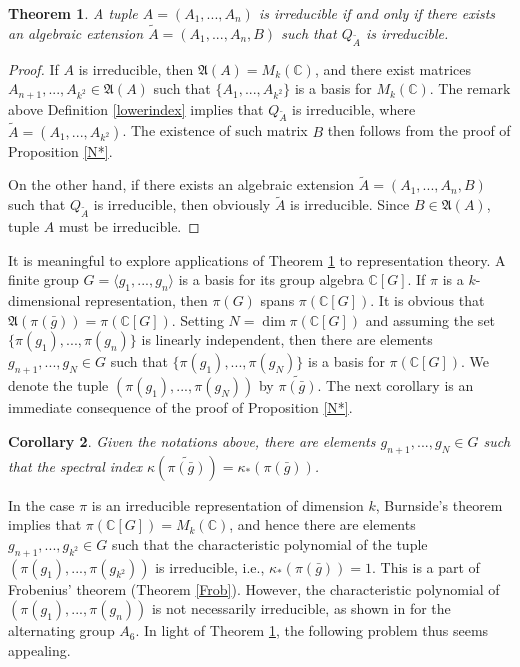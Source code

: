 \documentclass[draft, 12pt, reqno]{amsart}
\newcommand{\C}{{\mathbb C}}
\numberwithin{equation}{section}
\theoremstyle{plain}
\newtheorem{theorem}{Theorem}[section]
\newtheorem{corollary}[theorem]{Corollary}
\begin{document}
\begin{theorem}\label{mainthm}
 A tuple $A=(A_1, ..., A_n)$ is irreducible if and only if there exists an algebraic extension $\widetilde{A}=(A_1, ..., A_n, B)$ such that $Q_{\widetilde{A}}$ is irreducible. 
\end{theorem}
\begin{proof}
If $A$ is irreducible, then ${\mathfrak A}(A)=M_k(\C)$, and there exist matrices $A_{n+1}, ..., A_{k^2}\in {\mathfrak A}(A)$ such that $\{A_1, ..., A_{k^2}\}$ is a basis for $M_k(\C)$. The remark above Definition \ref{lowerindex} implies that $Q_{\widetilde{A}}$ is irreducible, where 
$\widetilde{A}=(A_1, ..., A_{k^2})$. The existence of such matrix $B$ then follows from the proof of Proposition \ref{N*}.

On the other hand, if there exists an algebraic extension $\widetilde{A}=(A_1, ..., A_n, B)$ such that $Q_{\widetilde{A}}$ is irreducible, then obviously $\widetilde{A}$ is irreducible. Since $B\in \mathfrak{A}(A)$, tuple $A$ must be irreducible.
\end{proof}

It is meaningful to explore applications of Theorem \ref{mainthm} to representation theory. A finite group $G=\langle g_1, ..., g_n\rangle$ is a basis for its group algebra $\C[G]$. 
 If $\pi$ is a $k$-dimensional representation, then $\pi(G)$ spans $\pi(\C[G])$. It is obvious that $\mathfrak{A}(\pi(\bar{g}))=\pi(\C[G])$. Setting $N=\dim \pi(\C[G])$ and assuming the set $\{\pi(g_1), ..., \pi(g_n)\}$ is linearly independent, then there are elements $g_{n+1}, ..., g_N\in G$ such that $\{\pi(g_1), ..., \pi(g_N)\}$ is a basis for $\pi(\C[G])$. We denote the tuple $(\pi(g_1), ..., \pi(g_N))$ by $\widetilde{\pi(\bar{g})}$. The next corollary is an immediate consequence of the proof of Proposition \ref{N*}.

\begin{corollary}
Given the notations above, there are elements $g_{n+1}, ..., g_N\in G$ such that the spectral index $\kappa(\widetilde{\pi(\bar{g})})=\kappa_*(\pi(\bar{g}))$.
\end{corollary}
In the case $\pi$ is an irreducible representation of dimension $k$, Burnside's theorem implies that $\pi(\C[G])=M_k(\C)$, and hence there are elements $g_{n+1}, ..., g_{k^2}\in G$ such that the characteristic polynomial of the tuple $(\pi(g_1), ..., \pi(g_{k^2}))$ is irreducible, i.e., $\kappa_*(\pi(\bar{g}))=1$. This is a part of Frobenius' theorem (Theorem \ref{Frob}). However, the characteristic polynomial of $(\pi(g_1), ..., \pi(g_n))$ is not necessarily irreducible, as shown in \cite{KV} for the alternating group $A_6$. In light of Theorem \ref{mainthm}, the following problem thus seems appealing. 
\end{document}
